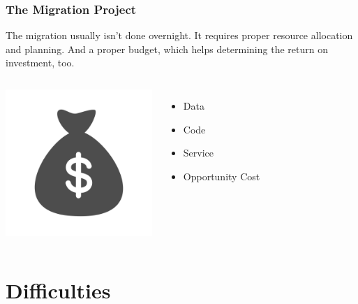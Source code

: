 \documentclass{beamer}
\begin{document}
\begin{frame}[fragile]
  \frametitle{The Migration Project}

  The migration usually isn't done overnight. It requires proper resource
  allocation and planning. And a proper budget, which helps determining the
  return on investment, too.

  \vfill
  
  \begin{columns}[c]
    \begin{center}
      \includegraphics[height=15em]{budget.png}
    \end{center}

    \begin{itemize}
    \item Data
    \item Code
    \item Service
    \item Opportunity Cost
    \end{itemize}
  \end{columns}
\end{frame}

\section{Difficulties}
\end{document}
